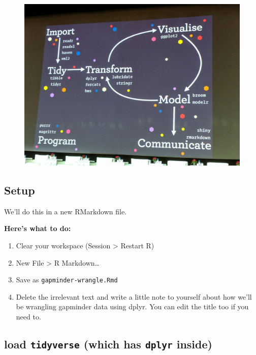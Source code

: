 \documentclass[]{book}
\providecommand{\tightlist}{%
  \setlength{\itemsep}{0pt}\setlength{\parskip}{0pt}}
\theoremstyle{definition}
\theoremstyle{definition}
\theoremstyle{definition}
\theoremstyle{remark}
\begin{document}
\begin{figure}
\centering
\includegraphics{img/tidyverse_wickham_pres.jpg}
\caption{}
\end{figure}

\subsection{Setup}\label{setup}

We'll do this in a new RMarkdown file.

\textbf{Here's what to do:}

\begin{enumerate}
\def\labelenumi{\arabic{enumi}.}
\tightlist
\item
  Clear your workspace (Session \textgreater{} Restart R)
\item
  New File \textgreater{} R Markdown\ldots{}
\item
  Save as \texttt{gapminder-wrangle.Rmd}
\item
  Delete the irrelevant text and write a little note to yourself about
  how we'll be wrangling gapminder data using dplyr. You can edit the
  title too if you need to.
\end{enumerate}

\subsection{\texorpdfstring{load \texttt{tidyverse} (which has
\texttt{dplyr}
inside)}{load tidyverse (which has dplyr inside)}}\label{load-tidyverse-which-has-dplyr-inside}
\end{document}
